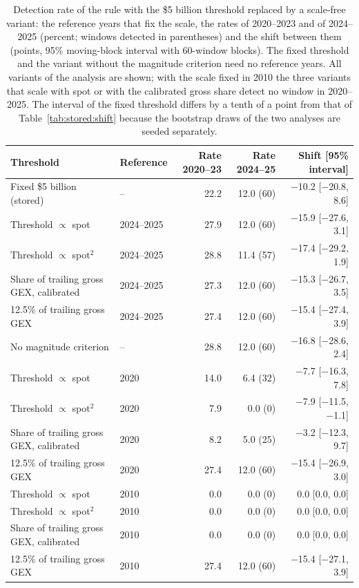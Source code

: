 \begin{table}[H]
\centering
\caption{Detection rate of the rule with the \$5 billion threshold replaced by a scale-free variant: the reference years that fix the scale, the rates of 2020--2023 and of 2024--2025 (percent; windows detected in parentheses) and the shift between them (points, 95\% moving-block interval with 60-window blocks). The fixed threshold and the variant without the magnitude criterion need no reference years. All variants of the analysis are shown; with the scale fixed in 2010 the three variants that scale with spot or with the calibrated gross share detect no window in 2020--2025. The interval of the fixed threshold differs by a tenth of a point from that of Table~\ref{tab:stored:shift} because the bootstrap draws of the two analyses are seeded separately.}
\label{tab:stored:scalefree}
\footnotesize
\begin{tabular}{@{}llrrr@{}}
\toprule
Threshold & Reference & Rate 2020--23 & Rate 2024--25 & Shift [95\% interval] \\
\midrule
Fixed \$5 billion (stored) & -- & 22.2 & 12.0 (60) & $-$10.2 [$-$20.8, 8.6] \\
Threshold $\propto$ spot & 2024--2025 & 27.9 & 12.0 (60) & $-$15.9 [$-$27.6, 3.1] \\
Threshold $\propto$ spot$^2$ & 2024--2025 & 28.8 & 11.4 (57) & $-$17.4 [$-$29.2, 1.9] \\
Share of trailing gross GEX, calibrated & 2024--2025 & 27.3 & 12.0 (60) & $-$15.3 [$-$26.7, 3.5] \\
12.5\% of trailing gross GEX & 2024--2025 & 27.4 & 12.0 (60) & $-$15.4 [$-$27.4, 3.9] \\
No magnitude criterion & -- & 28.8 & 12.0 (60) & $-$16.8 [$-$28.6, 2.4] \\
Threshold $\propto$ spot & 2020 & 14.0 & 6.4 (32) & $-$7.7 [$-$16.3, 7.8] \\
Threshold $\propto$ spot$^2$ & 2020 & 7.9 & 0.0 (0) & $-$7.9 [$-$11.5, $-$1.1] \\
Share of trailing gross GEX, calibrated & 2020 & 8.2 & 5.0 (25) & $-$3.2 [$-$12.3, 9.7] \\
12.5\% of trailing gross GEX & 2020 & 27.4 & 12.0 (60) & $-$15.4 [$-$26.9, 3.0] \\
Threshold $\propto$ spot & 2010 & 0.0 & 0.0 (0) & 0.0 [0.0, 0.0] \\
Threshold $\propto$ spot$^2$ & 2010 & 0.0 & 0.0 (0) & 0.0 [0.0, 0.0] \\
Share of trailing gross GEX, calibrated & 2010 & 0.0 & 0.0 (0) & 0.0 [0.0, 0.0] \\
12.5\% of trailing gross GEX & 2010 & 27.4 & 12.0 (60) & $-$15.4 [$-$27.1, 3.9] \\
\bottomrule
\end{tabular}
\end{table}

